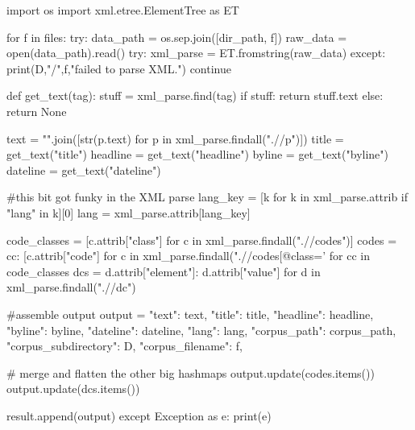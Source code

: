 \begin{lstlisting}[frame=none,caption={Extract and Parse RCV1 XML document into csv},captionpos=b,label=lst:RCV1Extraction]
\end{lstlisting}
\begin{python}	
	import os
	import xml.etree.ElementTree as ET

	for f in files:
		try:
			data_path = os.sep.join([dir_path, f])
			raw_data = open(data_path).read()
			try:
				xml_parse = ET.fromstring(raw_data)
			except:
				print(D,"/",f,"failed to parse XML.")
				continue
		
			def get_text(tag): 
				stuff = xml_parse.find(tag)
				if stuff: 
					return stuff.text
				else: 
					return None
	
		text = "\n\n".join([str(p.text) for p in xml_parse.findall(".//p")])
		title = get_text("title")
		headline = get_text("headline")
		byline = get_text("byline")
		dateline = get_text("dateline")
		
		#this bit got funky in the XML parse
		lang_key = [k for k in xml_parse.attrib if "lang" in k][0]
		lang = xml_parse.attrib[lang_key]
	
		code_classes = [c.attrib["class"] 
		for c in xml_parse.findall(".//codes")]
		codes = {cc: [c.attrib["code"] for c in 
			xml_parse.findall(".//codes[@class='%
			for cc in code_classes}
		dcs = {d.attrib["element"]: d.attrib["value"] 
			for d in xml_parse.findall(".//dc")}
		
		#assemble output
		output = {"text": text,
			"title": title,
			"headline": headline,
			"byline": byline,
			"dateline": dateline,
			"lang": lang,
			"corpus_path": corpus_path,
			"corpus_subdirectory": D,
			"corpus_filename": f,
		}
		
		# merge and flatten the other big hashmaps
		output.update(codes.items())
		output.update(dcs.items())
		
		result.append(output)
	except Exception as e:
		print(e)
\end{python}


